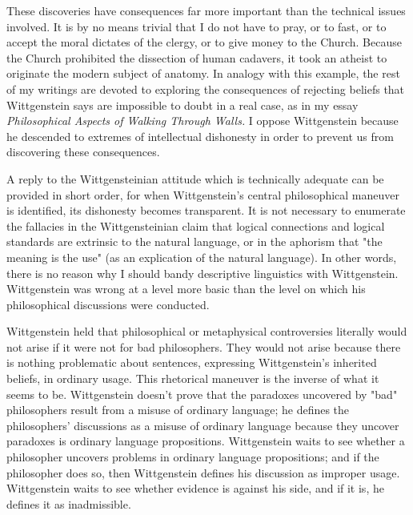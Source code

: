 \documentclass[10pt,twoside]{memoir}
\newcommand{\essaytitle}[1]{
	\emph{#1}}
\begin{document}
\begin{enumerate}
These discoveries have consequences far more important than the 
technical issues involved. It is by no means trivial that I do not have to pray, 
or to fast, or to accept the moral dictates of the clergy, or to give money to 
the Church. Because the Church prohibited the dissection of human 
cadavers, it took an atheist to originate the modern subject of anatomy. In 
analogy with this example, the rest of my writings are devoted to exploring 
the consequences of rejecting beliefs that Wittgenstein says are impossible to 
doubt in a real case, as in my essay \essaytitle{Philosophical Aspects of Walking 
Through Walls.} I oppose Wittgenstein because he descended to extremes of 
intellectual dishonesty in order to prevent us from discovering these 
consequences. 

A reply to the Wittgensteinian attitude which is technically adequate 
can be provided in short order, for when Wittgenstein's central philosophical 
maneuver is identified, its dishonesty becomes transparent. It is not 
necessary to enumerate the fallacies in the Wittgensteinian claim that logical 
connections and logical standards are extrinsic to the natural language, or in 
the aphorism that "the meaning is the use" (as an explication of the natural 
language). In other words, there is no reason why I should bandy descriptive 
linguistics with Wittgenstein. Wittgenstein was wrong at a level more basic 
than the level on which his philosophical discussions were conducted. 

Wittgenstein held that philosophical or metaphysical controversies 
literally would not arise if it were not for bad philosophers. They would not 
arise because there is nothing problematic about sentences, expressing 
Wittgenstein's inherited beliefs, in ordinary usage. This rhetorical maneuver 
is the inverse of what it seems to be. Wittgenstein doesn't prove that the 
paradoxes uncovered by "bad" philosophers result from a misuse of ordinary 
language; he defines the philosophers' discussions as a misuse of ordinary 
language because they uncover paradoxes is ordinary language propositions. 
Wittgenstein waits to see whether a philosopher uncovers problems in 
ordinary language propositions; and if the philosopher does so, then 
Wittgenstein defines his discussion as improper usage. Wittgenstein waits to 
see whether evidence is against his side, and if it is, he defines it as 
inadmissible. 


\end{enumerate}
\end{document}
